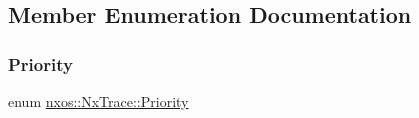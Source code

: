 \subsection{Member Enumeration Documentation}
\mbox{\label{classnxos_1_1_nx_trace_a582f6e5a22e788c61807657f8bca088f}} 
\subsubsection{\texorpdfstring{Priority}{Priority}}
{\footnotesize\ttfamily enum \mbox{\hyperlink{classnxos_1_1_nx_trace_a582f6e5a22e788c61807657f8bca088f}{nxos\+::\+Nx\+Trace\+::\+Priority}}}

